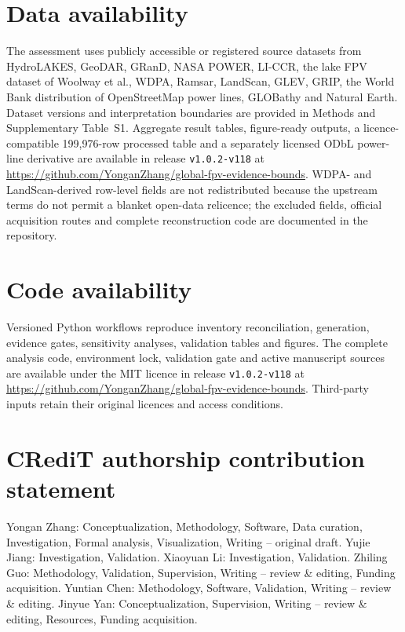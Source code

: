 
\clearpage
\section*{Data availability}
The assessment uses publicly accessible or registered source datasets from HydroLAKES, GeoDAR, GRanD, NASA POWER, LI-CCR, the lake FPV dataset of Woolway et al., WDPA, Ramsar, LandScan, GLEV, GRIP, the World Bank distribution of OpenStreetMap power lines, GLOBathy and Natural Earth. Dataset versions and interpretation boundaries are provided in Methods and Supplementary Table~S1. Aggregate result tables, figure-ready outputs, a licence-compatible 199{,}976-row processed table and a separately licensed ODbL power-line derivative are available in release \texttt{v1.0.2-v118} at \url{https://github.com/YonganZhang/global-fpv-evidence-bounds}. WDPA- and LandScan-derived row-level fields are not redistributed because the upstream terms do not permit a blanket open-data relicence; the excluded fields, official acquisition routes and complete reconstruction code are documented in the repository.

\section*{Code availability}
Versioned Python workflows reproduce inventory reconciliation, generation, evidence gates, sensitivity analyses, validation tables and figures. The complete analysis code, environment lock, validation gate and active manuscript sources are available under the MIT licence in release \texttt{v1.0.2-v118} at \url{https://github.com/YonganZhang/global-fpv-evidence-bounds}. Third-party inputs retain their original licences and access conditions.

\section*{CRediT authorship contribution statement}
Yongan Zhang: Conceptualization, Methodology, Software, Data curation, Investigation, Formal analysis, Visualization, Writing -- original draft. Yujie Jiang: Investigation, Validation. Xiaoyuan Li: Investigation, Validation. Zhiling Guo: Methodology, Validation, Supervision, Writing -- review \& editing, Funding acquisition. Yuntian Chen: Methodology, Software, Validation, Writing -- review \& editing. Jinyue Yan: Conceptualization, Supervision, Writing -- review \& editing, Resources, Funding acquisition.

